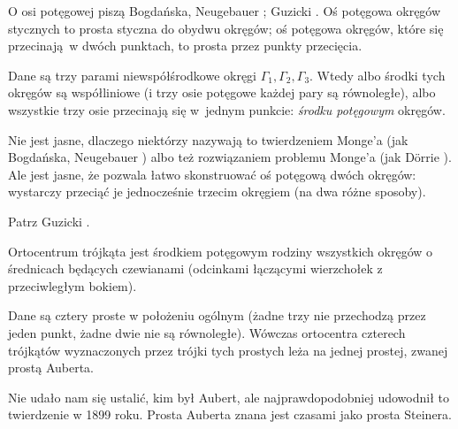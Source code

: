 O osi potęgowej piszą Bogdańska, Neugebauer \cite[s. 69]{neugebauer_2018}; Guzicki \cite[s. 173, 174]{guzicki_2021}.
Oś potęgowa okręgów stycznych to prosta styczna do obydwu okręgów; oś potęgowa okręgów, które się przecinają w dwóch punktach, to prosta przez punkty przecięcia.

\begin{proposition}
	Dane są trzy parami niewspółśrodkowe okręgi $\Gamma_1, \Gamma_2, \Gamma_3$.
	Wtedy albo środki tych okręgów są współliniowe (i trzy osie potęgowe każdej pary są równoległe), albo wszystkie trzy osie przecinają się w~jednym punkcie: \emph{środku potęgowym} okręgów.
\end{proposition}

Nie jest jasne, dlaczego niektórzy nazywają to twierdzeniem Monge'a (jak Bogdańska, Neugebauer \cite[s. ???]{neugebauer_2018}) albo też rozwiązaniem problemu Monge'a (jak Dörrie \cite[s. 151]{dorrie_1965}).
Ale jest jasne, że pozwala łatwo skonstruować oś potęgową dwóch okręgów: wystarczy przeciąć je jednocześnie trzecim okręgiem (na dwa różne sposoby).

Patrz Guzicki \cite[s. 174]{guzicki_2021}.

\begin{proposition}
	Ortocentrum trójkąta jest środkiem potęgowym rodziny wszystkich okręgów o średnicach będących czewianami (odcinkami łączącymi wierzchołek z przeciwległym bokiem).
\end{proposition}

\begin{theorem}[Auberta]
	Dane są cztery proste w położeniu ogólnym (żadne trzy nie przechodzą przez jeden punkt, żadne dwie nie są równoległe).
	Wówczas ortocentra czterech trójkątów wyznaczonych przez trójki tych prostych leża na jednej prostej, zwanej prostą Auberta.
\end{theorem}

Nie udało nam się ustalić, kim był Aubert, ale najprawdopodobniej udowodnił to twierdzenie w 1899 roku.
Prosta Auberta znana jest czasami jako prosta Steinera.

